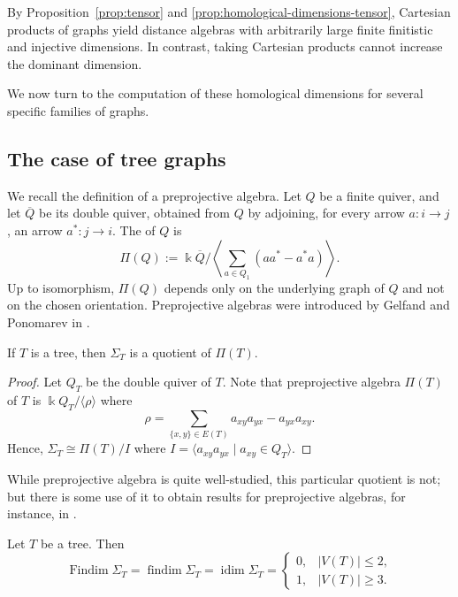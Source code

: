 \documentclass[a4paper,leqno]{amsart}
\begin{document}
\begin{rmk}
    By Proposition~\ref{prop:tensor} and \ref{prop:homological-dimensions-tensor}, Cartesian products of graphs yield distance algebras with arbitrarily large finite finitistic and injective dimensions. In contrast, taking Cartesian products cannot increase the dominant dimension.
\end{rmk}

We now turn to the computation of these homological dimensions for several specific families of graphs.


\subsection{The case of tree graphs}\label{subsec:tree}

We recall the definition of a preprojective algebra. Let $Q$ be a
finite quiver, and let $\overline Q$ be its double quiver, obtained
from $Q$ by adjoining, for every arrow $a:i\to j$, an arrow
$a^*:j\to i$. The  of $Q$ is
$$\Pi(Q):=\Bbbk\overline Q\bigg/\left\langle\sum_{a\in Q_1}(aa^*-a^*a)
\right\rangle.$$
Up to isomorphism, $\Pi(Q)$ depends only on the underlying graph of
$Q$ and not on the chosen orientation. Preprojective algebras were
introduced by Gelfand and Ponomarev in \cite{GP79}.

\begin{prop}
If $T$ is a tree, then $\Sigma_T$ is a quotient of $\Pi(T)$.
\end{prop}

\begin{proof}
Let $Q_T$ be the double quiver of $T$. Note that preprojective algebra $\Pi(T)$ of $T$ is $\Bbbk Q_T/\langle \rho\rangle$ where
$$\rho=\sum_{\{x,y\}\in E(T)}a_{xy}a_{yx}-a_{yx}a_{xy}.$$
Hence, $\Sigma_T \cong \Pi(T)/I$ where $I=\langle a_{xy}a_{yx}\mid a_{xy}\in Q_T\rangle$.
\end{proof}

While preprojective algebra is quite well-studied, this particular quotient is not; but there is some use of it to obtain results for preprojective algebras, for instance, in \cite{Miz14}.

\begin{prop}\label{prop:idim Sigma tree}
Let $T$ be a tree. Then
$$
\operatorname{Findim} \Sigma_T=\operatorname{findim} \Sigma_T=\operatorname{idim}\Sigma_T=
\begin{cases}
0, & |V(T)|\leq 2,\\
1, & |V(T)|\geq 3.
\end{cases}
$$
\end{prop}
\end{document}
